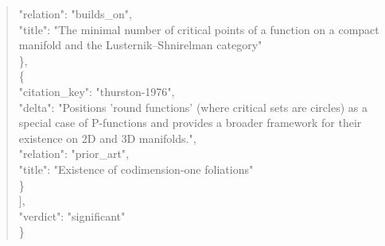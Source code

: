 \documentclass[11pt]{article}
\begin{document}
\begin{quote}
      "relation": "builds\_on",\\
      "title": "The minimal number of critical points of a function on a compact manifold and the Lusternik--Shnirelman category"\\
    \},\\
    \{\\
      "citation\_key": "thurston-1976",\\
      "delta": "Positions 'round functions' (where critical sets are circles) as a special case of P-functions and provides a broader framework for their existence on 2D and 3D manifolds.",\\
      "relation": "prior\_art",\\
      "title": "Existence of codimension-one foliations"\\
    \}\\
  ],\\
  "verdict": "significant"\\
\}\\
\end{quote}
\end{document}
